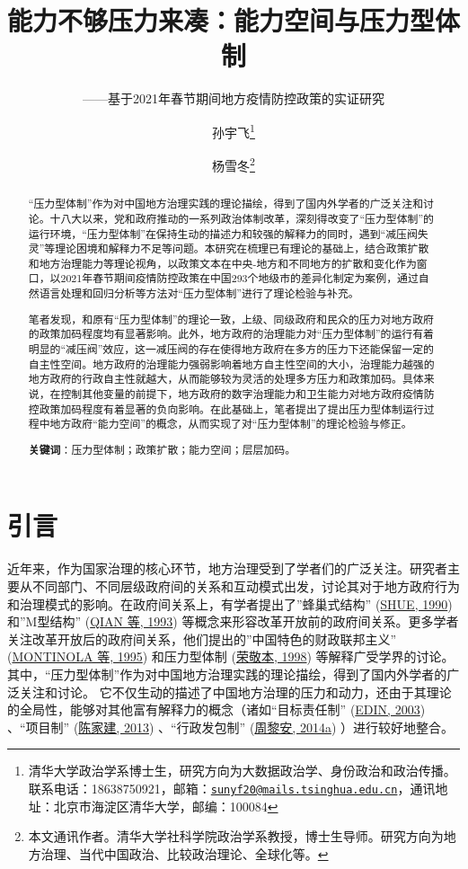 \documentclass[
  12pt,
]{ctexart}
\title{能力不够压力来凑：能力空间与压力型体制}
\subtitle{------基于2021年春节期间地方疫情防控政策的实证研究}
\author{孙宇飞\footnote{清华大学政治学系博士生，研究方向为大数据政治学、身份政治和政治传播。联系电话：18638750921，邮箱：\href{mailto:sunyf20@mails.tsinghua.edu.cn}{\nolinkurl{sunyf20@mails.tsinghua.edu.cn}}，通讯地址：北京市海淀区清华大学，邮编：100084} \and 杨雪冬\footnote{本文通讯作者。清华大学社科学院政治学系教授，博士生导师。研究方向为地方治理、当代中国政治、比较政治理论、全球化等。}}
\date{}
\begin{document}
\maketitle
\begin{abstract}
``压力型体制''作为对中国地方治理实践的理论描绘，得到了国内外学者的广泛关注和讨论。十八大以来，党和政府推动的一系列政治体制改革，深刻得改变了``压力型体制''的运行环境，``压力型体制''在保持生动的描述力和较强的解释力的同时，遇到``减压阀失灵''等理论困境和解释力不足等问题。本研究在梳理已有理论的基础上，结合政策扩散和地方治理能力等理论视角，以政策文本在中央-地方和不同地方的扩散和变化作为窗口，以2021年春节期间疫情防控政策在中国293个地级市的差异化制定为案例，通过自然语言处理和回归分析等方法对``压力型体制''进行了理论检验与补充。

笔者发现，和原有``压力型体制''的理论一致，上级、同级政府和民众的压力对地方政府的政策加码程度均有显著影响。此外，地方政府的治理能力对``压力型体制''的运行有着明显的``减压阀''效应，这一减压阀的存在使得地方政府在多方的压力下还能保留一定的自主性空间。地方政府的治理能力强弱影响着地方自主性空间的大小，治理能力越强的地方政府的行政自主性就越大，从而能够较为灵活的处理多方压力和政策加码。具体来说，在控制其他变量的前提下，地方政府的数字治理能力和卫生能力对地方政府疫情防控政策加码程度有着显著的负向影响。在此基础上，笔者提出了提出压力型体制运行过程中地方政府``能力空间''的概念，从而实现了对``压力型体制''的理论检验与修正。

\textbf{关键词}：压力型体制；政策扩散；能力空间；层层加码。
\end{abstract}

\hypertarget{ux5f15ux8a00}{%
\section{引言}\label{ux5f15ux8a00}}

近年来，作为国家治理的核心环节，地方治理受到了学者们的广泛关注。研究者主要从不同部门、不同层级政府间的关系和互动模式出发，讨论其对于地方政府行为和治理模式的影响。在政府间关系上，有学者提出了''蜂巢式结构'' (\protect\hyperlink{ref-Shue1990}{SHUE, 1990}) 和''M型结构'' (\protect\hyperlink{ref-QianXu1993}{QIAN 等, 1993}) 等概念来形容改革开放前的政府间关系。更多学者关注改革开放后的政府间关系，他们提出的''中国特色的财政联邦主义'' (\protect\hyperlink{ref-MontinolaEtAl1995}{MONTINOLA 等, 1995}) 和压力型体制 (\protect\hyperlink{ref-RongJingBen1998}{荣敬本, 1998}) 等解释广受学界的讨论。其中，``压力型体制''作为对中国地方治理实践的理论描绘，得到了国内外学者的广泛关注和讨论。 它不仅生动的描述了中国地方治理的压力和动力，还由于其理论的全局性，能够对其他富有解释力的概念（诸如``目标责任制'' (\protect\hyperlink{ref-Edin2003}{EDIN, 2003}) 、``项目制'' (\protect\hyperlink{ref-ChenJiaJian2013}{陈家建, 2013}) 、``行政发包制'' (\protect\hyperlink{ref-ZhouLiAn2014}{周黎安, 2014a}) ）进行较好地整合。
\end{document}
